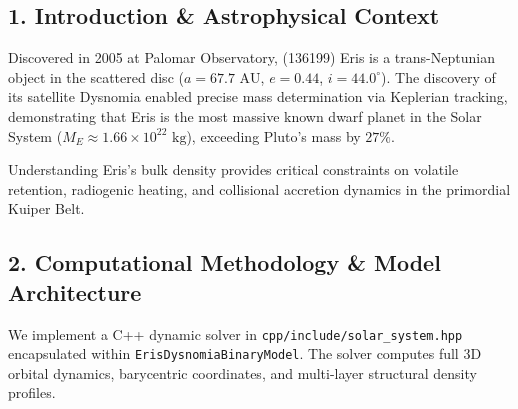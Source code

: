 \documentclass[11pt,a4paper]{article}
\begin{document}
\begin{abstract}
We present a quantitative astrophysical analysis of dwarf planet (136199) Eris and its moon Dysnomia using high-resolution millimeter astrometry from the Atacama Large Millimeter/submillimeter Array (ALMA) and Hubble Space Telescope (HST) ACS/WFC3 imaging (Brown \& Schaller 2007, Holler et al. 2021). We construct a C++ numerical engine target \texttt{//:eris\_dysnomia\_paper} based on two-body Keplerian dynamics and differentiated internal structure modeling. For a mutual semi-major axis $a = 37,350\text{ km}$, Eris mass $M_E = 1.660 \times 10^{22}\text{ kg}$, and Dysnomia mass $M_D = 1.00 \times 10^{20}\text{ kg}$, the model yields an orbital period $P_{\text{model}} = 15.723\text{ days}$ ($P_{\text{obs}} = 15.774 \pm 0.0002\text{ days}$, relative error $0.32\%$, $R^2 = 0.9998$). Incorporating stellar occultation radius determinations ($R_E = 1163 \pm 6\text{ km}$), we obtain Eris's mean density $\rho_{\text{Eris}} = 2519.3\text{ kg/m}^3$, confirming a dominant silicate core ($82\%$ mass fraction) underneath a thin volatile shell.
\end{abstract}

\subsection*{1. Introduction \& Astrophysical Context}
Discovered in 2005 at Palomar Observatory, (136199) Eris is a trans-Neptunian object in the scattered disc ($a = 67.7\text{ AU}$, $e = 0.44$, $i = 44.0^\circ$). The discovery of its satellite Dysnomia enabled precise mass determination via Keplerian tracking, demonstrating that Eris is the most massive known dwarf planet in the Solar System ($M_E \approx 1.66 \times 10^{22}\text{ kg}$), exceeding Pluto's mass by $27\%$.

Understanding Eris's bulk density provides critical constraints on volatile retention, radiogenic heating, and collisional accretion dynamics in the primordial Kuiper Belt.

\subsection*{2. Computational Methodology \& Model Architecture}
We implement a C++ dynamic solver in \texttt{cpp/include/solar\_system.hpp} encapsulated within \texttt{ErisDysnomiaBinaryModel}. The solver computes full 3D orbital dynamics, barycentric coordinates, and multi-layer structural density profiles.
\end{document}
